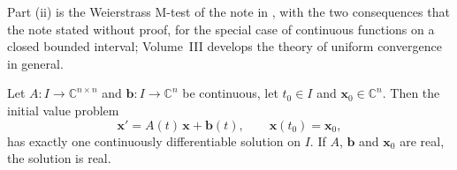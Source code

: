 Part (ii) is the Weierstrass M-test of the note in , with the two consequences that the note stated without proof, for the special case of continuous functions on a closed bounded interval; Volume~III develops the theory of uniform convergence in general.

\begin{theorem}
\label{thm:linear-existence}
Let $A\colon I\to\mathbb C^{n\times n}$ and $\mathbf b\colon I\to\mathbb C^n$ be continuous, let $t_0\in I$ and $\mathbf x_0\in\mathbb C^n$. Then the initial value problem
\[
\mathbf x'=A(t)\,\mathbf x+\mathbf b(t),\qquad\mathbf x(t_0)=\mathbf x_0 ,
\]
has exactly one continuously differentiable solution on $I$. If $A$, $\mathbf b$ and $\mathbf x_0$ are real, the solution is real.
\end{theorem}

